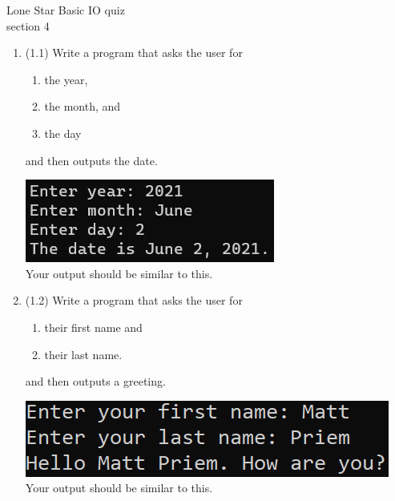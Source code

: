 \documentclass{article}
\begin{document}

Lone Star \hfill Basic IO quiz\\
section 4\\
\begin{enumerate}
\item (1.1) Write a program that asks the user for \\
		\begin{minipage}{0.5\textwidth}	
		\vspace*{-0.5em}
			\begin{enumerate}  \setlength\itemsep{-0.3em}
				\item the year,
				\item the month, and
				\item the day	
			\end{enumerate} \vspace*{-1ex}
		and then outputs the date.
		\end{minipage}
		\begin{minipage}{0.5\textwidth}
			\centering
			\includegraphics[scale=0.75]{./imgs/dateOutput.png}\\
			Your output should be similar to this.
		\end{minipage}

	

\item (1.2) 
		Write a program that asks the user for \\
		\begin{minipage}{0.5\textwidth}
		\vspace*{-0.5em}
			\begin{enumerate}  \setlength\itemsep{-0.3em}
				\item their first name and
				\item their last name.  
			\end{enumerate} \vspace*{-1ex}
		and then outputs a greeting.
		\end{minipage}
		\begin{minipage}{0.5\textwidth}
			\centering
			\includegraphics[scale=0.9]{./imgs/outputGreeting.png}\\
			Your output should be similar to this.
		\end{minipage}


\end{enumerate}
\end{document}
